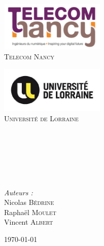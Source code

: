 \begin{titlepage}

\begin{center}

\begin{minipage}[t]{0.48\textwidth}
  \begin{flushleft}
	\includegraphics [width=50mm]{images/logo-telecom.png} \\[0.5cm]
      \textsc{\LARGE Telecom Nancy}
  \end{flushleft}
\end{minipage}
\begin{minipage}[t]{0.48\textwidth}
  \begin{flushright}
    \includegraphics [width=50mm]{images/logo-ul.jpg} \\[0.5cm]
    \textsc{\LARGE Université de Lorraine}
  \end{flushright}
\end{minipage} \\[1.5cm]


	\textsc{\Large \reportsubject}\\[0.5cm]
	\HRule \\[0.4cm]
	{\huge \bfseries \reporttitle}\\[0.4cm]
	\HRule \\[1.5cm]
	
	\begin{minipage}[t]{0.3\textwidth}
 	 	\begin{flushleft} \large
  		\end{flushleft}
	\end{minipage}
	\begin{minipage}[t]{0.6\textwidth}
  		\begin{flushright} \large
    		\emph{Auteurs :} \\
    		Nicolas \textsc{Bédrine} \\
    		Raphaël \textsc{Moulet} \\
    		Vincent \textsc{Albert} \\
  		\end{flushright}
	\end{minipage}

\vfill

{\large \today{}}

\end{center}

\end{titlepage}
